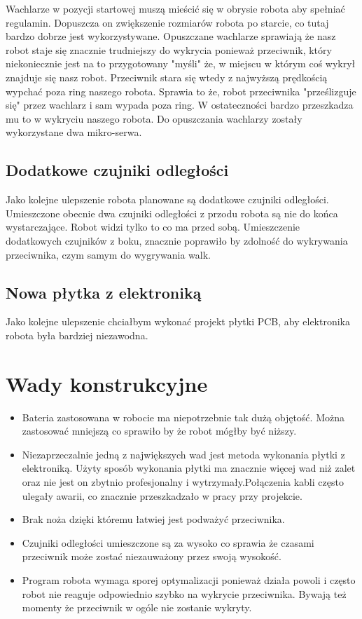 \documentclass[polish,polish,a4paper]{article}
\begin{document}
    Wachlarze w pozycji startowej muszą mieścić się w obrysie robota aby spełniać regulamin. Dopuszcza on zwiększenie rozmiarów robota po starcie, co tutaj bardzo dobrze jest wykorzystywane.
    \newline
    Opuszczane wachlarze sprawiają że nasz robot staje się znacznie trudniejszy do wykrycia ponieważ przeciwnik, który niekoniecznie jest na to przygotowany "myśli" że, w miejscu w którym coś wykrył znajduje się nasz robot. Przeciwnik stara się wtedy z najwyższą prędkością wypchać poza ring naszego robota. Sprawia to że, robot przeciwnika "prześlizguje się" przez wachlarz i sam wypada poza ring. W ostateczności bardzo przeszkadza mu to w wykryciu naszego robota.
    \newline Do opuszczania wachlarzy zostały wykorzystane dwa mikro-serwa.
    
    \subsection{Dodatkowe czujniki odległości}
    Jako kolejne ulepszenie robota planowane są dodatkowe czujniki odległości. Umieszczone obecnie dwa czujniki odległości z przodu robota są nie do końca wystarczające. Robot widzi tylko to co ma przed sobą. Umieszczenie dodatkowych czujników z boku, znacznie poprawiło by zdolność do wykrywania przeciwnika, czym samym do wygrywania walk.
    \subsection{Nowa płytka z elektroniką}
    Jako kolejne ulepszenie chciałbym wykonać projekt płytki PCB, aby elektronika robota była bardziej niezawodna.
    
    
    \section{Wady konstrukcyjne}
    \begin{itemize}
  \item Bateria zastosowana w robocie ma niepotrzebnie tak dużą objętość. Można zastosować mniejszą co sprawiło by że robot mógłby być niższy.
  
  \item  Niezaprzeczalnie jedną z największych wad jest metoda wykonania płytki z elektroniką. Użyty sposób wykonania płytki ma znacznie więcej wad niż zalet oraz nie jest on zbytnio profesjonalny i wytrzymały.Połączenia kabli często ulegały awarii, co znacznie przeszkadzało w pracy przy projekcie.
  
  \item Brak noża dzięki któremu łatwiej jest podważyć przeciwnika.
  
  \item Czujniki odległości umieszczone są za wysoko co sprawia że czasami przeciwnik może zostać niezauważony przez swoją wysokość. 
  
  \item Program robota wymaga sporej optymalizacji ponieważ działa powoli i często robot nie reaguje odpowiednio szybko na wykrycie przeciwnika. Bywają też momenty że przeciwnik w ogóle nie zostanie wykryty.

\end{itemize}
\newpage
\end{document}
